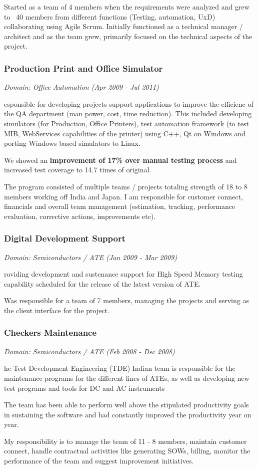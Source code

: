 \documentclass[a4paper,12pt]{article}
\newcommand\cvprojectentry[5]{
  \subsubsection*{#1}
  
  \vspace{-7pt}
  
  \it{Domain: #2}\normalfont{} \quad (#3 - #4)
  
}
\begin{document}
Started as a team of 4 members when the requirements were analyzed and
grew to ~40 members from different functions (Testing, automation,
UxD) collaborating using Agile Scrum. Initially functioned as a
technical manager / architect and as the team grew, primarily focused
on the technical aspects of the project.

\cvprojectentry{Production Print and Office Simulator}{Office Automation}{Apr 2009}{Jul 2011}
 
Responsible for developing projects support applications to improve
the efficienc of the QA department (man power, cost, time
reduction). This included developing simulators (for Production,
Office Printers), test automation framework (to test MIB, WebServices
capabilities of the printer) using C++, Qt on Windows and porting
Windows based simulators to Linux.
 
We showed an \textbf{improvement of 17\% over manual testing process} and
increased test coverage to 14.7 times of original.
 
The program consisted of multiple teams / projects totaling strength
of 18 to 8 members working off India and Japan. I am responsible for
customer connect, financials and overall team management (estimation,
tracking, performance evaluation, corrective actions, improvements
etc).
 
\cvprojectentry{Digital Development Support}{Semiconductors / ATE}{Jan 2009}{Mar 2009}
 
Providing development and sustenance support for High Speed Memory
testing capability scheduled for the release of the latest version of
ATE.
 
Was responsible for a team of 7 members, managing the projects and
serving as the client interface for the project.
 
\cvprojectentry{Checkers Maintenance}{Semiconductors / ATE}{Feb 2008}{Dec 2008}

The Test Development Engineering (TDE) Indian team is responsible for
the maintenance programs for the different lines of ATEs, as well as
developing new test programs and tools for DC and AC instruments

The team has been able to perform well above the stipulated
productivity goals in sustaining the software and had constantly
improved the productivity year on year.
 
My responsibility is to manage the team of 11 - 8 members, maintain
customer connect, handle contractual activities like generating SOWs,
billing, monitor the performance of the team and suggest improvement
initiatives.
 
\end{document}
